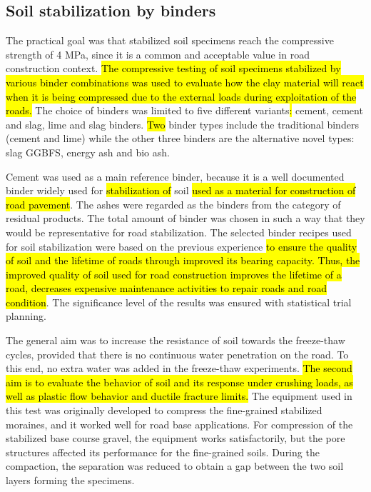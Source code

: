 \documentclass[constrmater,article,submit,pdftex,moreauthors]{Definitions/mdpi}
\begin{document}
\subsection{Soil stabilization by binders}

The practical goal was that stabilized soil specimens reach the compressive strength of 4 MPa, since it is a common and acceptable value in road construction context. \hl{The compressive testing of soil specimens stabilized by various binder combinations was used to evaluate how the clay material will react when it is being compressed due to the external loads during exploitation of the roads. }The choice of binders was limited to five different variants\hl{: }cement, cement and slag,\hl{ }lime and slag binders. \hl{Two} binder types include the traditional binders (cement and lime) while the other three binders are the alternative novel types: slag GGBFS, energy ash and bio ash. 

Cement was used as a main reference binder, because it is a well documented binder widely used for \hl{stabilization of} soil\hl{ used as a material for construction of road pavement}. The ashes were regarded as the binders from the category of residual products. The total amount of binder was chosen in such a way that they would be representative for road stabilization. The selected binder recipes used for soil stabilization were based on the previous experience \hl{to ensure the quality of soil and the lifetime of roads through improved its bearing capacity. Thus, the improved quality of soil used for road construction improves the lifetime of a road, decreases expensive maintenance activities to repair roads and road condition}. The significance level of the results was ensured with statistical trial planning. 

The general aim was to increase the resistance of soil towards the freeze-thaw cycles, provided that there is no continuous water penetration on the road. To this end, no extra water was added in the freeze-thaw experiments. \hl{The second aim is to evaluate the  behavior of soil and its response under crushing loads, as well as plastic flow behavior and ductile fracture limits. }The equipment used in this test was originally developed to compress the fine-grained stabilized moraines, and it worked well for road base applications. For compression of the stabilized base course gravel, the equipment works satisfactorily, but the pore structures affected its performance for the fine-grained soils. During the compaction, the separation was reduced to obtain a gap between the two soil layers forming the specimens.
\end{document}

